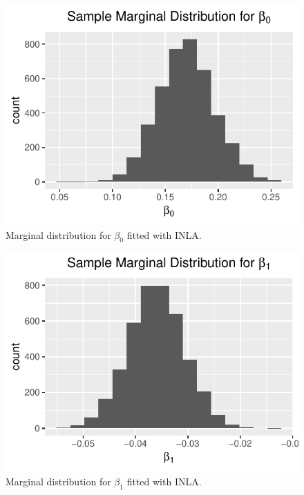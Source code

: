 \documentclass[letterpaper,11pt]{article}
\begin{document}
\begin{enumerate}
\begin{enumerate}
\begin{description}
      \begin{figure}
        \centering
        \includegraphics{p3_beta_0.pdf}
        \caption{Marginal distribution for $\beta_0$ fitted with INLA.}
        \label{fig:p3_beta_0}
      \end{figure}

      \begin{figure}
        \centering
        \includegraphics{p3_beta_1.pdf}
        \caption{Marginal distribution for $\beta_1$ fitted with INLA.}
        \label{fig:p3_beta_1}
      \end{figure}


\end{description}
\end{enumerate}
\end{enumerate}
\end{document}
